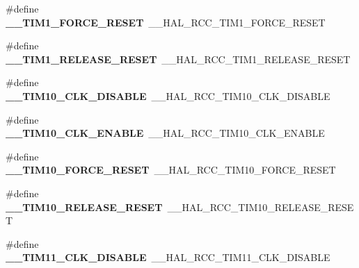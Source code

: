 \begin{DoxyCompactItemize}
\item 
\hypertarget{group___h_a_l___r_c_c___aliased_ga42e9934d811e4a1eb3e1315ced3f9616}{\#define {\bfseries \-\_\-\-\_\-\-T\-I\-M1\-\_\-\-F\-O\-R\-C\-E\-\_\-\-R\-E\-S\-E\-T}~\-\_\-\-\_\-\-H\-A\-L\-\_\-\-R\-C\-C\-\_\-\-T\-I\-M1\-\_\-\-F\-O\-R\-C\-E\-\_\-\-R\-E\-S\-E\-T}\label{group___h_a_l___r_c_c___aliased_ga42e9934d811e4a1eb3e1315ced3f9616}

\item 
\hypertarget{group___h_a_l___r_c_c___aliased_ga11d22b1ab7d4d7b9e21f70feca19d595}{\#define {\bfseries \-\_\-\-\_\-\-T\-I\-M1\-\_\-\-R\-E\-L\-E\-A\-S\-E\-\_\-\-R\-E\-S\-E\-T}~\-\_\-\-\_\-\-H\-A\-L\-\_\-\-R\-C\-C\-\_\-\-T\-I\-M1\-\_\-\-R\-E\-L\-E\-A\-S\-E\-\_\-\-R\-E\-S\-E\-T}\label{group___h_a_l___r_c_c___aliased_ga11d22b1ab7d4d7b9e21f70feca19d595}

\item 
\hypertarget{group___h_a_l___r_c_c___aliased_ga6015db503657bee4d141974992681af4}{\#define {\bfseries \-\_\-\-\_\-\-T\-I\-M10\-\_\-\-C\-L\-K\-\_\-\-D\-I\-S\-A\-B\-L\-E}~\-\_\-\-\_\-\-H\-A\-L\-\_\-\-R\-C\-C\-\_\-\-T\-I\-M10\-\_\-\-C\-L\-K\-\_\-\-D\-I\-S\-A\-B\-L\-E}\label{group___h_a_l___r_c_c___aliased_ga6015db503657bee4d141974992681af4}

\item 
\hypertarget{group___h_a_l___r_c_c___aliased_gaaede2703ebcc0edcfe2508364b465ba2}{\#define {\bfseries \-\_\-\-\_\-\-T\-I\-M10\-\_\-\-C\-L\-K\-\_\-\-E\-N\-A\-B\-L\-E}~\-\_\-\-\_\-\-H\-A\-L\-\_\-\-R\-C\-C\-\_\-\-T\-I\-M10\-\_\-\-C\-L\-K\-\_\-\-E\-N\-A\-B\-L\-E}\label{group___h_a_l___r_c_c___aliased_gaaede2703ebcc0edcfe2508364b465ba2}

\item 
\hypertarget{group___h_a_l___r_c_c___aliased_ga51608836d363e8f56bcd43ef9846cec4}{\#define {\bfseries \-\_\-\-\_\-\-T\-I\-M10\-\_\-\-F\-O\-R\-C\-E\-\_\-\-R\-E\-S\-E\-T}~\-\_\-\-\_\-\-H\-A\-L\-\_\-\-R\-C\-C\-\_\-\-T\-I\-M10\-\_\-\-F\-O\-R\-C\-E\-\_\-\-R\-E\-S\-E\-T}\label{group___h_a_l___r_c_c___aliased_ga51608836d363e8f56bcd43ef9846cec4}

\item 
\hypertarget{group___h_a_l___r_c_c___aliased_ga69408398d8d314c1ad20868dc155bd1a}{\#define {\bfseries \-\_\-\-\_\-\-T\-I\-M10\-\_\-\-R\-E\-L\-E\-A\-S\-E\-\_\-\-R\-E\-S\-E\-T}~\-\_\-\-\_\-\-H\-A\-L\-\_\-\-R\-C\-C\-\_\-\-T\-I\-M10\-\_\-\-R\-E\-L\-E\-A\-S\-E\-\_\-\-R\-E\-S\-E\-T}\label{group___h_a_l___r_c_c___aliased_ga69408398d8d314c1ad20868dc155bd1a}

\item 
\hypertarget{group___h_a_l___r_c_c___aliased_ga976ce9e8e4584c22a293cac41a8c681a}{\#define {\bfseries \-\_\-\-\_\-\-T\-I\-M11\-\_\-\-C\-L\-K\-\_\-\-D\-I\-S\-A\-B\-L\-E}~\-\_\-\-\_\-\-H\-A\-L\-\_\-\-R\-C\-C\-\_\-\-T\-I\-M11\-\_\-\-C\-L\-K\-\_\-\-D\-I\-S\-A\-B\-L\-E}\label{group___h_a_l___r_c_c___aliased_ga976ce9e8e4584c22a293cac41a8c681a}


\end{DoxyCompactItemize}
